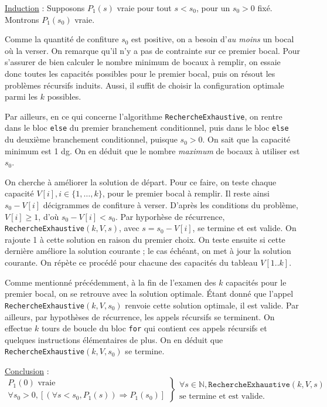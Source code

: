 \documentclass[12pt,a4paper]{article}
\begin{document}
\medskip
\underline{Induction} : Supposons \( P_{1}(s) \) vraie pour tout \( s < s_0 \), pour un $s_0>0$ fix\'e. Montrons \( P_{1}(s_0) \) vraie.

Comme la quantit\'e de confiture $s_0$ est positive, on a besoin d'{\itshape au moins} un bocal o\`u la verser. On remarque qu'il n'y a pas de contrainte sur ce premier bocal. Pour s'assurer de bien calculer le nombre minimum de bocaux \`a remplir, on essaie donc toutes les capacit\'es possibles pour le premier bocal, puis on r\'esout les probl\`emes r\'ecursifs induits. Aussi, il suffit de choisir la configuration optimale parmi les $k$ possibles.

Par ailleurs, en ce qui concerne l'algorithme \texttt{RechercheExhaustive}, on rentre dans le bloc \texttt{else} du premier branchement conditionnel, puis dans le bloc \texttt{else} du deuxi\`eme branchement conditionnel, puisque $s_0 > 0$. On sait que la capacit\'e minimum est 1 \si{dg}. On en d\'eduit que le nombre {\itshape maximum} de bocaux \`a utiliser est $s_0$. 

On cherche \`a am\'eliorer la solution de d\'epart. Pour ce faire, on teste chaque capacit\'e $V[i], i \in \{1, \dotsc, k \}$, pour le premier bocal \`a remplir. Il reste ainsi $s_0-V[i]$ d\'ecigrammes de confiture \`a verser. D'apr\`es les conditions du probl\`eme, $V[i] \geq 1$, d'o\`u $s_0-V[i] < s_0$. Par hyporh\`ese de r\'ecurrence, \texttt{RechercheExhaustive}$(k,V,s)$, avec $s=s_0-V[i]$, se termine et est valide. On rajoute 1 \`a cette solution en raison du premier choix. On teste ensuite si cette derni\`ere am\'eliore la solution courante ; le cas \'ech\'eant, on met \`a jour la solution courante. On r\'ep\`ete ce proc\'ed\'e pour chacune des capacit\'es du tableau $V[1..k]$. 

Comme mentionn\'e pr\'ec\'edemment, \`a la fin de l'examen des $k$ capacit\'es pour le premier bocal, on se retrouve avec la solution optimale. 
\'Etant donn\'e que l'appel \texttt{RechercheExhaustive}$(k, V, s_0)$ renvoie cette solution optimale, il est valide. 
Par ailleurs, par hypoth\`eses de r\'ecurrence, les appels r\'ecursifs se terminent. On effectue $k$ tours de boucle du bloc \texttt{for} qui contient ces appels r\'ecursifs et quelques instructions \'el\'ementaires de plus.
On en d\'eduit que \texttt{RechercheExhaustive}$(k, V, s_0)$ se termine.

\medskip
\underline{Conclusion} : 
\begin{equation*}
\left .\begin{array}{l}
P_{1}(0) \text{ vraie } \\
\forall s_0 > 0, [(\forall s < s_0, P_{1}(s)) \Rightarrow P_{1}(s_0) ]
\end{array} \right \}
\left .\begin{array}{l}
\forall s \in \mathbb{N}, \texttt{RechercheExhaustive}(k,V,s) \\
\text{se termine et est valide.}
\end{array}\right .
\end{equation*}
\end{document}
